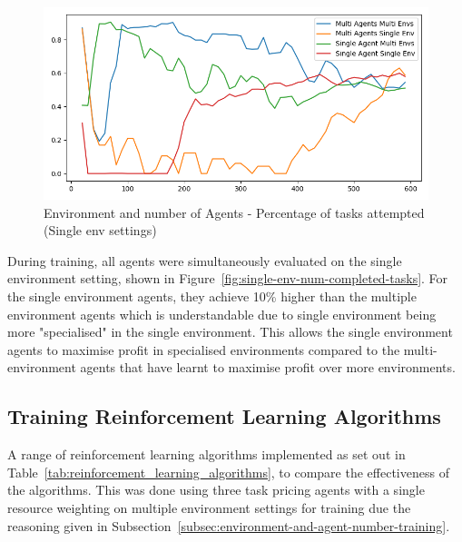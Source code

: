\begin{figure}[H]
    \centering
    \includegraphics[width=\linewidth]{figures/5_evaluation_figs/env_agent_num_training_fig/single_env_percent_tasks.png}
    \caption{Environment and number of Agents - Percentage of tasks attempted (Single env settings)}
    \label{fig:single-env-percent-tasks}
\end{figure}

During training, all agents were simultaneously evaluated on the single environment setting, shown in
Figure~\ref{fig:single-env-num-completed-tasks}. For the single environment agents, they achieve 10\% higher than the
multiple environment agents which is understandable due to single environment being more "specialised" in the single
environment. This allows the single environment agents to maximise profit in specialised environments compared to the
multi-environment agents that have learnt to maximise profit over more environments.

\subsection{Training Reinforcement Learning Algorithms}
\label{subsec:training-reinforcement-learning-algorithms}

A range of reinforcement learning algorithms implemented as set out in Table~\ref{tab:reinforcement_learning_algorithms},
to compare the effectiveness of the algorithms. This was done using three task pricing agents with
a single resource weighting on multiple environment settings for training due the reasoning given in
Subsection~\ref{subsec:environment-and-agent-number-training}.

